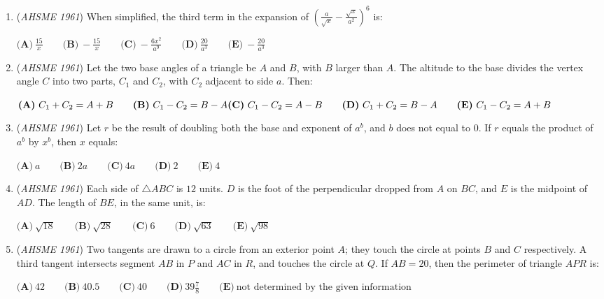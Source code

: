 \begin{enumerate}
 $\textbf{(A)}\ 6\log{2} \qquad \textbf{(B)}\ \log{2} \qquad \textbf{(C)}\ 1 \qquad \textbf{(D)}\ 0\qquad \textbf{(E)}\ -1$


	\item (\textit{AHSME 1961}) When simplified, the third term in the expansion of $(\frac{a}{\sqrt{x}}-\frac{\sqrt{x}}{a^2})^6$ is:


 $\textbf{(A)}\ \frac{15}{x}\qquad \textbf{(B)}\ -\frac{15}{x}\qquad \textbf{(C)}\ -\frac{6x^2}{a^9} \qquad \textbf{(D)}\ \frac{20}{a^3}\qquad \textbf{(E)}\ -\frac{20}{a^3}$


	\item (\textit{AHSME 1961}) Let the two base angles of a triangle be $A$ and $B$, with $B$ larger than $A$. 
The altitude to the base divides the vertex angle $C$ into two parts, $C_1$ and $C_2$, with $C_2$ adjacent to side $a$. Then:


 $\textbf{(A)}\ C_1+C_2=A+B \qquad \textbf{(B)}\ C_1-C_2=B-A \qquad\\ \textbf{(C)}\ C_1-C_2=A-B \qquad \textbf{(D)}\ C_1+C_2=B-A\qquad \textbf{(E)}\ C_1-C_2=A+B$


	\item (\textit{AHSME 1961}) Let $r$ be the result of doubling both the base and exponent of $a^b$, and $b$ does not equal to $0$. 
If $r$ equals the product of $a^b$ by $x^b$, then $x$ equals:


 $\textbf{(A)}\ a \qquad \textbf{(B)}\ 2a \qquad \textbf{(C)}\ 4a \qquad \textbf{(D)}\ 2\qquad \textbf{(E)}\ 4$


	\item (\textit{AHSME 1961}) Each side of $\triangle ABC$ is $12$ units. $D$ is the foot of the perpendicular dropped from $A$ on $BC$, 
and $E$ is the midpoint of $AD$. The length of $BE$, in the same unit, is:


 $\textbf{(A)}\ \sqrt{18} \qquad \textbf{(B)}\ \sqrt{28} \qquad \textbf{(C)}\ 6 \qquad \textbf{(D)}\ \sqrt{63} \qquad \textbf{(E)}\ \sqrt{98}$


	\item (\textit{AHSME 1961}) Two tangents are drawn to a circle from an exterior point $A$; they touch the circle at points $B$ and $C$ respectively. 
A third tangent intersects segment $AB$ in $P$ and $AC$ in $R$, and touches the circle at $Q$. If $AB=20$, then the perimeter of triangle $APR$ is:


 $\textbf{(A)}\ 42\qquad \textbf{(B)}\ 40.5 \qquad \textbf{(C)}\ 40\qquad \textbf{(D)}\ 39\frac{7}{8} \qquad \textbf{(E)}\ \text{not determined by the given information}$



\end{enumerate}
